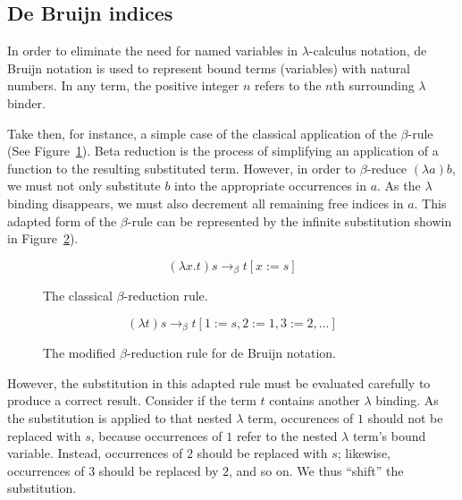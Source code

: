 \subsection{De Bruijn indices}

In order to eliminate the need for named variables in $\lambda$-calculus notation, de Bruijn notation is used to represent bound terms (variables) with natural numbers. In any term, the positive integer $n$ refers to the $n$th surrounding $\lambda$ binder.\cite{debruijn1972}


Take then, for instance, a simple case of the classical application of the $\beta$-rule (See Figure~\ref{eq:beta_rule}). Beta reduction is the process of simplifying an application of a function to the resulting substituted term. However, in order to $\beta$-reduce $(\lambda a)b$, we must not only substitute $b$ into the appropriate occurrences in $a$. As the $\lambda$ binding disappears, we must also decrement all remaining free indices in $a$. This adapted form of the $\beta$-rule can be represented by the infinite substitution showin in Figure~\ref{eq:beta_rule2}).\cite{abadi1991}


\begin{figure}
\begin{equation*}
(\lambda x.t)s \to_{\beta} t[x := s]
\end{equation*}
\caption{The classical $\beta$-reduction rule.}
\label{eq:beta_rule}
\end{figure}

\begin{figure}
\begin{equation*}
(\lambda t)s \to_{\beta} t[1 := s, 2 := 1, 3 := 2, ...]
\end{equation*}
\caption{The modified $\beta$-reduction rule for de Bruijn notation.}
\label{eq:beta_rule2}
\end{figure}

However, the substitution in this adapted rule must be evaluated carefully to produce a correct result. Consider if the term $t$ contains another $\lambda$ binding. As the substitution is applied to that nested $\lambda$ term, occurences of $1$ should not be replaced with $s$, because occurrences of $1$ refer to the nested $\lambda$ term's bound variable. Instead, occurrences of $2$ should be replaced with $s$; likewise, occurrences of $3$ should be replaced by $2$, and so on. We thus ``shift'' the substitution.\cite{abadi1991}

